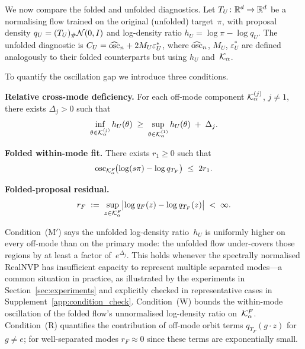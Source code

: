 We now compare the folded and unfolded diagnostics.
Let $T_U\colon \mathbb{R}^d \to \mathbb{R}^d$ be a normalising flow trained on the
original (unfolded) target~$\pi$, with proposal density
$q_U = (T_U)_{\#}\mathcal{N}(0,I)$ and log-density ratio
$h_U = \log\pi - \log q_U$.
The unfolded diagnostic is
$C_U = \widehat{\mathrm{osc}}_n + 2 M_U \varepsilon_U^*$, where
$\widehat{\mathrm{osc}}_n$, $M_U$, $\varepsilon_U^*$ are defined
analogously to their folded counterparts but using $h_U$
and~$\mathcal{K}_\alpha$.

To quantify the oscillation gap we introduce three conditions.

\begin{description}[leftmargin=1.5em,nosep]
  \item[(M\,$'$)]
  \textbf{Relative cross-mode deficiency.}
  For each off-mode component $\mathcal{K}_\alpha^{(j)}$, $j \neq 1$,
  there exists $\Delta_j > 0$ such that
  \begin{equation}\label{eq:cond_M}
    \inf_{\theta \in \mathcal{K}_\alpha^{(j)}} h_U(\theta)
    \;\geq\;
    \sup_{\theta \in \mathcal{K}_\alpha^{(1)}} h_U(\theta)
    \;+\; \Delta_j.
  \end{equation}

  \item[(W)]
  \textbf{Folded within-mode fit.}
  There exists $r_1 \geq 0$ such that
  \begin{equation}\label{eq:cond_W}
    \mathrm{osc}_{\mathcal{K}_\alpha^F}\!\bigl(\log(s\pi) - \log q_{T_F}\bigr)
    \;\leq\; 2r_1.
  \end{equation}

  \item[(R)]
  \textbf{Folded-proposal residual.}
  \begin{equation}\label{eq:cond_R}
    r_F \;:=\;
    \sup_{z \in \mathcal{K}_\alpha^F}
    \bigl|\log q_F(z) - \log q_{T_F}(z)\bigr|
    \;<\; \infty.
  \end{equation}
\end{description}

\noindent
Condition~(M$'$) says the unfolded log-density ratio~$h_U$ is
uniformly higher on every off-mode than on the primary mode: the
unfolded flow under-covers those regions by at least a factor
of~$e^{\Delta_j}$.  This holds whenever the spectrally normalised
RealNVP has insufficient capacity to represent multiple separated
modes---a common situation in practice, as illustrated by the experiments
in Section~\ref{sec:experiments} and explicitly checked in
representative cases in Supplement~\ref{app:condition_check}.
Condition~(W) bounds the within-mode oscillation of the folded
flow's unnormalised log-density ratio on~$\mathcal{K}_\alpha^F$.
Condition~(R) quantifies the contribution of off-mode orbit
terms $q_{T_F}(g \cdot z)$ for $g \neq e$; for well-separated
modes $r_F \approx 0$ since these terms are exponentially small.

